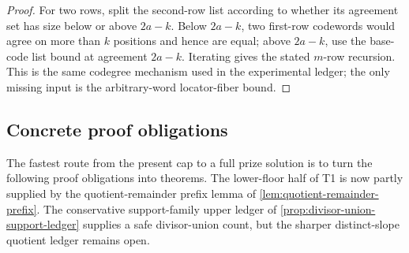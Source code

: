 \documentclass[11pt]{article}
\theoremstyle{definition}
\theoremstyle{remark}
\begin{document}
\begin{proof}
For two rows, split the second-row list according to whether its agreement set
has size below or above $2a-k$.  Below $2a-k$, two first-row codewords would
agree on more than $k$ positions and hence are equal; above $2a-k$, use the
base-code list bound at agreement $2a-k$.  Iterating gives the stated $m$-row
recursion.  This is the same codegree mechanism used in the experimental ledger;
the only missing input is the arbitrary-word locator-fiber bound.
\end{proof}

\subsection{Concrete proof obligations}

The fastest route from the present cap to a full prize solution is to turn the
following proof obligations into theorems.  The lower-floor half of T1 is now
partly supplied by the quotient-remainder prefix lemma of
\cref{lem:quotient-remainder-prefix}.  The conservative support-family upper
ledger of \cref{prop:divisor-union-support-ledger} supplies a safe divisor-union
count, but the sharper distinct-slope quotient ledger remains open.
\end{document}

